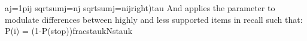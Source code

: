 {}\markdownRendererDollarSign{}\markdownRendererDollarSign{}a\markdownRendererLeftBrace{}j=1\markdownRendererRightBrace{}\markdownRendererLeftBrace{}p\markdownRendererLeftBrace{}ij\markdownRendererRightBrace{}\markdownRendererRightBrace{}\markdownRendererRightBrace{} \markdownRendererLeftBrace{}\markdownRendererBackslash{}sqrt\markdownRendererLeftBrace{}\markdownRendererBackslash{}sum\markdownRendererCircumflex{}\markdownRendererLeftBrace{}j=n\markdownRendererRightBrace{}j\markdownRendererRightBrace{}\markdownRendererRightBrace{} \markdownRendererBackslash{}sqrt\markdownRendererLeftBrace{}\markdownRendererBackslash{}sum\markdownRendererCircumflex{}\markdownRendererLeftBrace{}j=n\markdownRendererRightBrace{}\markdownRendererLeftBrace{}ij\markdownRendererRightBrace{}\markdownRendererRightBrace{}\markdownRendererRightBrace{}\markdownRendererRightBrace{}\markdownRendererRightBrace{}\markdownRendererBackslash{}right)\markdownRendererCircumflex{}\markdownRendererLeftBrace{}\markdownRendererBackslash{}tau\markdownRendererRightBrace{}\markdownRendererDollarSign{}\markdownRendererDollarSign{}\markdownRendererInterblockSeparator
{}And applies the parameter to modulate differences between highly and less supported items in recall such that:\markdownRendererInterblockSeparator
{}\markdownRendererDollarSign{}\markdownRendererDollarSign{}P(i) = (1-P(stop))\markdownRendererBackslash{}frac\markdownRendererLeftBrace{}s\markdownRendererCircumflex{}\markdownRendererLeftBrace{}\markdownRendererBackslash{}tau\markdownRendererRightBrace{}\markdownRendererLeftBrace{}k\markdownRendererRightBrace{}\markdownRendererCircumflex{}\markdownRendererLeftBrace{}N\markdownRendererRightBrace{}s\markdownRendererCircumflex{}\markdownRendererLeftBrace{}\markdownRendererBackslash{}tau\markdownRendererRightBrace{}\markdownRendererUnderscore{}k\markdownRendererRightBrace{}\markdownRendererDollarSign{}\markdownRendererDollarSign{}\markdownRendererInterblockSeparator
